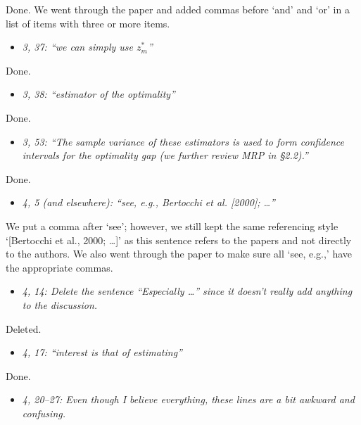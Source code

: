 \documentclass[11pt,notitlepage,onecolumn]{article}
\newcommand{\noi}{\noindent}
\begin{document}
\noi
Done.  
We went through the paper and added commas before `and' and `or' in a list of items with three or more items.
\medskip 


\begin{itemize}
\item[] \textit{3, 37: ``we can simply use $z_m^*$''}
\end{itemize}

\noi
Done. 
\medskip 


\begin{itemize}
\item[] \textit{3, 38: ``estimator of the optimality''}
\end{itemize}

\noi
Done.  
\medskip 


\begin{itemize}
\item[] \textit{3, 53: ``The sample variance of these estimators is used to form confidence intervals for the optimality gap (we further review MRP in \S 2.2).''}
\end{itemize}

\noi
Done. 
\medskip 


\begin{itemize}
\item[] \textit{4, 5 (and elsewhere): ``see, e.g., Bertocchi et al. [2000]; \ldots ''}
\end{itemize}

\noi
We put a comma after `see'; however, we still kept the same referencing style `[Bertocchi et al., 2000; \ldots]' as this sentence refers to the papers and not directly to the authors. 
We also went through the paper to make sure all `see, e.g.,' have the appropriate commas.
\medskip 


\begin{itemize}
\item[] \textit{4, 14: Delete the sentence ``Especially \ldots '' since it doesn't really add anything to the discussion.}
\end{itemize}

\noi
Deleted.
\medskip 


\begin{itemize}
\item[] \textit{4, 17: ``interest is that of estimating''}
\end{itemize}

\noi
Done.  
\medskip 


\begin{itemize}
\item[] \textit{4, 20--27: Even though I believe everything, these lines are a bit awkward and confusing.}
\end{itemize}
\end{document}
